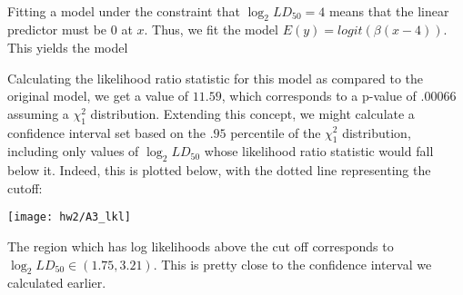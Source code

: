 \documentclass[11pt]{article}
\theoremstyle{definition}
\begin{document}
\begin{itemize}
        \vspace{-2mm} \\
        Fitting a model under the constraint that $\log_2LD_{50}=4$ means that the linear predictor must be $0$ at $x$. Thus, we fit the model $E(y) = logit(\beta(x-4))$. This yields the model
        \FloatBarrier
        
        \FloatBarrier
        Calculating the likelihood ratio statistic for this model as compared to the original model, we get a value of $11.59$, which corresponds to a p-value of $.00066$ assuming a $\chi^2_1$ distribution. Extending this concept, we might calculate a confidence interval set based on the $.95$ percentile of the $\chi^2_1$ distribution, including only values of $\log_2LD_{50}$ whose likelihood ratio statistic would fall below it. Indeed, this is plotted below, with the dotted line representing the cutoff:
        \begin{center}
            \texttt{[image: hw2/A3\_lkl]} 
        \end{center}
        The region which has log likelihoods above the cut off corresponds to $\log_2LD_{50}\in(1.75,3.21)$. This is pretty close to the confidence interval we calculated earlier. 

        
\end{itemize}
\end{document}
